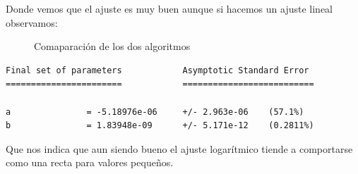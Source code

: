 \documentclass{article}
\begin{document}
Donde vemos que el ajuste es muy buen aunque si hacemos un ajuste lineal observamos: 

\begin{figure}[H]
  \centering   

\caption{Comaparación de los dos algoritmos}
\end{figure}

\begin{verbatim}
Final set of parameters            Asymptotic Standard Error
=======================            ==========================

a               = -5.18976e-06     +/- 2.963e-06    (57.1%)
b               = 1.83948e-09      +/- 5.171e-12    (0.2811%)

\end{verbatim}

Que nos indica que aun siendo bueno el ajuste logarítmico tiende a
comportarse como una recta para valores pequeños.
\end{document}
